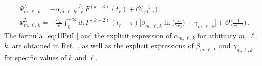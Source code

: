 \documentclass[prd,preprint,superscriptaddress,tightenlines,nofootinbib,
  eqsecnum,showpacs]{revtex4}
\begin{document}
%
\begin{subequations}
\begin{align} \label{eq:klPsiL}
& \Psi^L_{m,\ell,k} = - \alpha_{m,\ell,k} ~\frac{\hat{n}_L}{r} F^{(k-3)}
  (t_r) + \mathcal{O}\Big( \frac{1}{r^{2-\epsilon}}\Big) \,, \\ &
  \Psi^L_{m,\ell,k} = -\frac{\hat{n}_L}{r} \int^{+\infty}_0 \!\!\!\!
  d\tau F^{(k-2)} (t_r - \tau)\Big[ \beta_{m,\ell,k} \ln \Big(
    \frac{\tau}{2r_0} \Big) + \gamma_{m,\ell,k} \Big] +
  \mathcal{O}\Big( \frac{1}{r^{2-\epsilon}}\Big) \,.
\end{align}
\end{subequations}
%
The formula~\eqref{eq:1lPsiL} and the explicit expression of
$\alpha_{m,\ell,k}$ for arbitrary $m$, $\ell$, $k$, are obtained in
Ref.~\cite{B98tail}, as well as the explicit expressions of
$\beta_{m,\ell,k}$ and $\gamma_{m,\ell,k}$ for specific values of $k$
and $\ell$.
\end{document}
